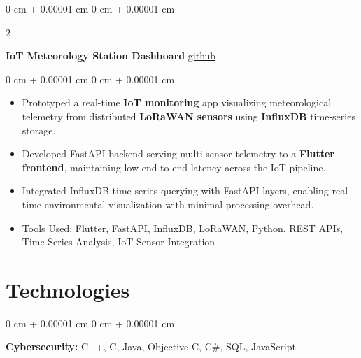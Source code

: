 \documentclass[10pt, letterpaper]{article}
\newenvironment{highlights}{
    \begin{itemize}[
        topsep=0.10 cm,
        parsep=0.10 cm,
        partopsep=0pt,
        itemsep=0pt,
        leftmargin=0 cm + 10pt
    ]
}{
    \end{itemize}
} %
\newenvironment{onecolentry}{
    \begin{adjustwidth}{
        0 cm + 0.00001 cm
    }{
        0 cm + 0.00001 cm
    }
}{
    \end{adjustwidth}
} %
\newenvironment{twocolentry}[2][]{
    \onecolentry
    \def\secondColumn{#2}
    \setcolumnwidth{\fill, 4.5 cm}
    \begin{paracol}{2}
}{
    \switchcolumn \raggedleft \secondColumn
    \end{paracol}
    \endonecolentry
} %
\begin{document}
            \vspace{0.2 cm}

    

        \begin{twocolentry}{
        \href{https://github.com/fathi-belmkadem/Meteorology-Station-Dashboard}{github}
            
        }
            \textbf{IoT Meteorology Station Dashboard}\end{twocolentry}

        \vspace{0.10 cm}
        \begin{onecolentry}
            \begin{highlights}
                \item Prototyped a real-time \textbf{IoT monitoring} app visualizing meteorological telemetry from distributed \textbf{LoRaWAN sensors} using \textbf{InfluxDB} time-series storage.


                \item Developed FastAPI backend serving multi-sensor telemetry to a \textbf{Flutter frontend}, maintaining low end-to-end latency across the IoT pipeline.
                \item Integrated InfluxDB time-series querying with FastAPI layers, enabling real-time environmental visualization with minimal processing overhead.





                \item Tools Used: Flutter, FastAPI, InfluxDB, LoRaWAN, Python, REST APIs, Time-Series Analysis, IoT Sensor Integration
            \end{highlights}
        \end{onecolentry}




    
    \section{Technologies}



        
        \begin{onecolentry}
            \textbf{Cybersecurity:} C++, C, Java, Objective-C, C\#, SQL, JavaScript
        \end{onecolentry}

        \vspace{0.2 cm}
\end{document}
